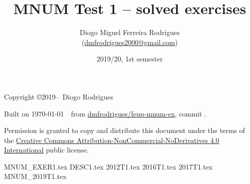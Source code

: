 \documentclass{mnum}
\title{MNUM Test 1 -- solved exercises}
\author{Diogo Miguel Ferreira Rodrigues \\ (\href{mailto:dmfrodrigues2000@gmail.com}{dmfrodrigues2000@gmail.com})}
\date{2019/20, 1st semester}
\begin{document}
\maketitle
\begin{secondpage}
    Copyright \copyright 2019--\the\year\ Diogo Rodrigues\par
    \par
    \immediate{}
    Built on \today~\currenttime~from \href{https://github.com/dmfrodrigues/feup-mnum-ex}{dmfrodrigues/feup-mnum-ex}, commit \unskip.\par
    Permission is granted to copy and distribute this document under the terms of the
    \href{https://creativecommons.org/licenses/by-nc-nd/4.0/}{Creative Commons Attribution-NonCommercial-NoDerivatives 4.0 International}
    public license.
\end{secondpage}
\frontmatter
\tableofcontents
\mainmatter
{MNUM_EXER1.tex}
{DESC1.tex}
{2012T1.tex}
{2016T1.tex}
{2017T1.tex}
{MNUM_2019T1.tex}
\end{document}
